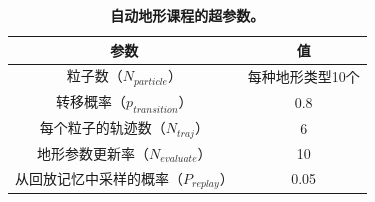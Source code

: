 \documentclass[9pt,twocolumn,twoside]{osajnl}
\begin{document}
\begin{table}
    \centering
    \begin{tabular}{|c|c|} \hline
        参数 & 值 \\ \hline
        粒子数（$N_{particle}$） & 每种地形类型10个 \\ \hline
        转移概率（$p_{transition}$） & 0.8 \\ \hline
        每个粒子的轨迹数（$N_{traj}$） & 6 \\ \hline
        地形参数更新率（$N_{evaluate}$） & 10 \\ \hline
        从回放记忆中采样的概率（$P_{replay}$） & 0.05 \\ \hline
    \end{tabular}
    \caption{\textbf{自动地形课程的超参数。}}
    \label{tab:pfparams}
\end{table}
\end{document}
